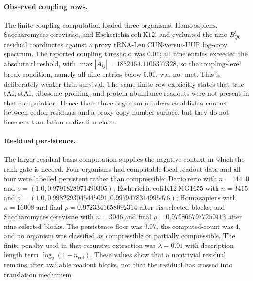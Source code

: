 \paragraph{Observed coupling rows.}
The finite coupling computation loaded three organisms, $\mathrm{Homo\ sapiens}$, $\mathrm{Saccharomyces\ cerevisiae}$, and $\mathrm{Escherichia\ coli\ K12}$, and evaluated the nine $B^*_{Q6}$ residual coordinates against a proxy tRNA-Leu CUN-versus-UUR log-copy spectrum. The reported coupling threshold was $0.01$; all nine entries exceeded the absolute threshold, with $\max |A_{ij}|=1882464.1106377328$, so the coupling-level break condition, namely all nine entries below $0.01$, was not met. This is deliberately weaker than survival. The same finite row explicitly states that true tAI, stAI, ribosome-profiling, and protein-abundance readouts were not present in that computation. Hence these three-organism numbers establish a contact between codon residuals and a proxy copy-number surface, but they do not license a translation-realization claim.

\paragraph{Residual persistence.}
The larger residual-basis computation supplies the negative context in which the rank gate is needed. Four organisms had computable local readout data and all four were labelled persistent rather than compressible: $\mathrm{Danio\ rerio}$ with $n=14410$ and $\rho=(1.0,0.9791828971490305)$; $\mathrm{Escherichia\ coli\ K12\ MG1655}$ with $n=3415$ and $\rho=(1.0,0.9982293045445091,0.9979478314995476)$; $\mathrm{Homo\ sapiens}$ with $n=16008$ and final $\rho=0.9723341658092314$ after six selected blocks; and $\mathrm{Saccharomyces\ cerevisiae}$ with $n=3046$ and final $\rho=0.9798667977250413$ after nine selected blocks. The persistence floor was $0.97$, the computed-count was $4$, and no organism was classified as compressible or partially compressible. The finite penalty used in that recursive extraction was $\lambda=0.01$ with description-length term $\log_2(1+n_{\mathrm{col}})$. These values show that a nontrivial residual remains after available readout blocks, not that the residual has crossed into translation mechanism.

